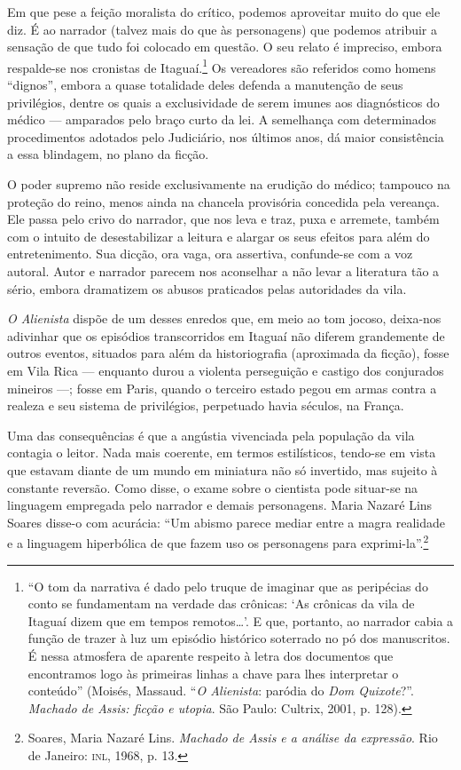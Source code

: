 Em que pese a feição moralista do crítico, podemos aproveitar muito do
que ele diz. É ao narrador (talvez mais do que às personagens) que
podemos atribuir a sensação de que tudo foi colocado em questão. O seu
relato é impreciso, embora respalde-se nos cronistas de
Itaguaí.\footnote{``O tom da narrativa é dado pelo truque de imaginar
  que as peripécias do conto se fundamentam na verdade das crônicas: `As
  crônicas da vila de Itaguaí dizem que em tempos remotos\ldots{}'. E que,
  portanto, ao narrador cabia a função de trazer à luz um episódio
  histórico soterrado no pó dos manuscritos. É nessa atmosfera de
  aparente respeito à letra dos documentos que encontramos logo às
  primeiras linhas a chave para lhes interpretar o conteúdo''
  (Moisés, Massaud. ``\emph{O
  Alienista}: paródia do \emph{Dom Quixote}?''. \emph{Machado de Assis:
  ficção e utopia}. São Paulo: Cultrix, 2001, p. 128).} Os vereadores
são referidos como homens ``dignos'', embora a quase totalidade deles
defenda a manutenção de seus privilégios, dentre os quais a
exclusividade de serem imunes aos diagnósticos do médico --- amparados
pelo braço curto da lei. A semelhança com determinados procedimentos
adotados pelo Judiciário, nos últimos anos, dá maior consistência a essa
blindagem, no plano da ficção.

O poder supremo não reside exclusivamente na erudição do médico;
tampouco na proteção do reino, menos ainda na chancela provisória
concedida pela vereança. Ele passa pelo crivo do narrador, que nos leva
e traz, puxa e arremete, também com o intuito de desestabilizar a
leitura e alargar os seus efeitos para além do entretenimento. Sua
dicção, ora vaga, ora assertiva, confunde-se com a voz autoral. Autor e
narrador parecem nos aconselhar a não levar a literatura tão a sério,
embora dramatizem os abusos praticados pelas autoridades da vila.

\emph{O Alienista} dispõe de um desses enredos que, em meio ao tom
jocoso, deixa-nos adivinhar que os episódios transcorridos em Itaguaí
não diferem grandemente de outros eventos, situados para além da
historiografia (aproximada da ficção), fosse em Vila Rica --- enquanto
durou a violenta perseguição e castigo dos conjurados mineiros ---; fosse
em Paris, quando o terceiro estado pegou em armas contra a realeza e seu
sistema de privilégios, perpetuado havia séculos, na França.

Uma das consequências é que a angústia vivenciada pela população da vila
contagia o leitor. Nada mais coerente, em termos estilísticos, tendo-se
em vista que estavam diante de um mundo em miniatura não só invertido,
mas sujeito à constante reversão. Como disse, o exame sobre o cientista
pode situar-se na linguagem empregada pelo narrador e demais
personagens. Maria Nazaré Lins Soares disse-o com acurácia: ``Um abismo
parece mediar entre a magra realidade e a linguagem hiperbólica de que
fazem uso os personagens para exprimi-la''.\footnote{Soares, Maria
  Nazaré Lins. \emph{Machado de Assis e a análise da expressão}. Rio de
  Janeiro: \textsc{inl}, 1968, p. 13.}

